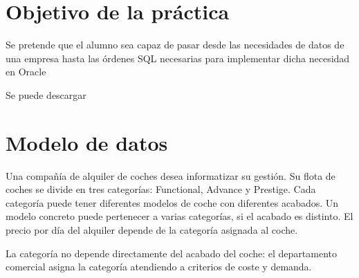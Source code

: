 
\usepackage{eurosym}





\renewcommand{\hmwkTitle}{Diseño E/R, paso a SQL e inserción de datos}
\renewcommand{\hmwkClass}{Gestión de Bases de Datos}

\usepackage{enumitem}%






\primerapagina


\section{Objetivo de la práctica}
Se pretende que el alumno sea capaz de pasar desde las necesidades de datos de una empresa hasta las órdenes SQL necesarias para implementar dicha necesidad en Oracle

Se puede descargar 

\section{Modelo de datos}
Una compañía de alquiler de coches desea informatizar su gestión.  Su flota de coches se divide en tres categorías: Functional, Advance y Prestige. Cada categoría puede tener diferentes modelos de coche con diferentes acabados. Un modelo concreto puede pertenecer a varias categorías, si el acabado es distinto. El precio por día del alquiler depende de la categoría asignada al coche.

La categoría no depende directamente del acabado del coche: el departamento comercial asigna la categoría atendiendo a criterios de coste y demanda.


